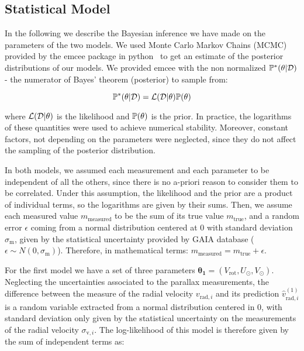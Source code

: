 \subsection{Statistical Model}\label{subsec:StatisticalModel}
In the following we describe the Bayesian inference we have made on the parameters of the two models. 
We used Monte Carlo Markov Chains (MCMC) provided by the emcee package in python~\cite{EMCEE} to get an estimate of the posterior distributions of our models.
We provided emcee with the non normalized $\mathbb{P}^{*}(\theta \vert \mathcal{D})$ - the numerator of Bayes' theorem (posterior) to sample from:

\begin{equation}\label{Eq:NonNormPosterior}
    \mathbb{P}^{*}(\theta \vert \mathcal{D}) = \mathcal{L}(\mathcal{D} \vert \theta) \mathbb{P}(\theta)
\end{equation}

\noindent where $\mathcal{L}(\mathcal{D} \vert \theta)$ is the likelihood and $\mathbb{P}(\theta)$ is the prior. In practice, the logarithms of these quantities were used to achieve numerical stability. Moreover, constant factors, not depending on the parameters were neglected, since they do not affect the sampling of the posterior distribution.

In both models, we assumed each measurement and each parameter to be independent of all the others, since there is no a-priori reason to consider them to be correlated. 
Under this assumption, the likelihood and the prior are a product of individual terms, so the logarithms are given by their sums. 
Then, we assume each measured value $m_{\text{measured}}$ to be the sum of its true value $m_{\text{true}}$, and a random error $\epsilon$ coming from a normal distribution centered at 0 with standard deviation $\sigma_{\text{m}}$, given by the statistical uncertainty provided by GAIA database ($\epsilon \sim N(0, \sigma_\text{m})$). 
Therefore, in mathematical terms: $m_{\text{measured}} = m_{\text{true}} + \epsilon$.

For the first model we have a set of three parameters $\mathbf{\theta_1} = (V_{\text{rot}}, U_{\odot}, V_{\odot})$. 
Neglecting the uncertainties associated to the parallax measurements, the difference between the measure of the radial velocity $v_{\text{rad}, i}$ and its prediction $\hat{v}^{(1)}_{\text{rad}, i}$ is a random variable extracted from a normal distribution centered in 0, with standard deviation only given by the statistical uncertainty on the measurements of the radial velocity $\sigma_{\text{v},i}$. 
The log-likelihood of this model is therefore given by the sum of independent terms as:

